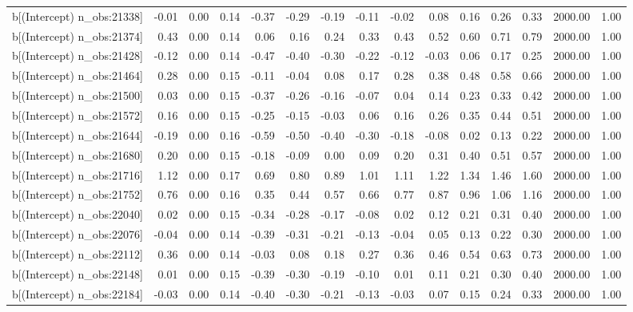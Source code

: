 \begin{table}[ht]
\begin{tabular}{rrrrrrrrrrrrrrr}
  b[(Intercept) n\_obs:21338] & -0.01 & 0.00 & 0.14 & -0.37 & -0.29 & -0.19 & -0.11 & -0.02 & 0.08 & 0.16 & 0.26 & 0.33 & 2000.00 & 1.00 \\ 
  b[(Intercept) n\_obs:21374] & 0.43 & 0.00 & 0.14 & 0.06 & 0.16 & 0.24 & 0.33 & 0.43 & 0.52 & 0.60 & 0.71 & 0.79 & 2000.00 & 1.00 \\ 
  b[(Intercept) n\_obs:21428] & -0.12 & 0.00 & 0.14 & -0.47 & -0.40 & -0.30 & -0.22 & -0.12 & -0.03 & 0.06 & 0.17 & 0.25 & 2000.00 & 1.00 \\ 
  b[(Intercept) n\_obs:21464] & 0.28 & 0.00 & 0.15 & -0.11 & -0.04 & 0.08 & 0.17 & 0.28 & 0.38 & 0.48 & 0.58 & 0.66 & 2000.00 & 1.00 \\ 
  b[(Intercept) n\_obs:21500] & 0.03 & 0.00 & 0.15 & -0.37 & -0.26 & -0.16 & -0.07 & 0.04 & 0.14 & 0.23 & 0.33 & 0.42 & 2000.00 & 1.00 \\ 
  b[(Intercept) n\_obs:21572] & 0.16 & 0.00 & 0.15 & -0.25 & -0.15 & -0.03 & 0.06 & 0.16 & 0.26 & 0.35 & 0.44 & 0.51 & 2000.00 & 1.00 \\ 
  b[(Intercept) n\_obs:21644] & -0.19 & 0.00 & 0.16 & -0.59 & -0.50 & -0.40 & -0.30 & -0.18 & -0.08 & 0.02 & 0.13 & 0.22 & 2000.00 & 1.00 \\ 
  b[(Intercept) n\_obs:21680] & 0.20 & 0.00 & 0.15 & -0.18 & -0.09 & 0.00 & 0.09 & 0.20 & 0.31 & 0.40 & 0.51 & 0.57 & 2000.00 & 1.00 \\ 
  b[(Intercept) n\_obs:21716] & 1.12 & 0.00 & 0.17 & 0.69 & 0.80 & 0.89 & 1.01 & 1.11 & 1.22 & 1.34 & 1.46 & 1.60 & 2000.00 & 1.00 \\ 
  b[(Intercept) n\_obs:21752] & 0.76 & 0.00 & 0.16 & 0.35 & 0.44 & 0.57 & 0.66 & 0.77 & 0.87 & 0.96 & 1.06 & 1.16 & 2000.00 & 1.00 \\ 
  b[(Intercept) n\_obs:22040] & 0.02 & 0.00 & 0.15 & -0.34 & -0.28 & -0.17 & -0.08 & 0.02 & 0.12 & 0.21 & 0.31 & 0.40 & 2000.00 & 1.00 \\ 
  b[(Intercept) n\_obs:22076] & -0.04 & 0.00 & 0.14 & -0.39 & -0.31 & -0.21 & -0.13 & -0.04 & 0.05 & 0.13 & 0.22 & 0.30 & 2000.00 & 1.00 \\ 
  b[(Intercept) n\_obs:22112] & 0.36 & 0.00 & 0.14 & -0.03 & 0.08 & 0.18 & 0.27 & 0.36 & 0.46 & 0.54 & 0.63 & 0.73 & 2000.00 & 1.00 \\ 
  b[(Intercept) n\_obs:22148] & 0.01 & 0.00 & 0.15 & -0.39 & -0.30 & -0.19 & -0.10 & 0.01 & 0.11 & 0.21 & 0.30 & 0.40 & 2000.00 & 1.00 \\ 
  b[(Intercept) n\_obs:22184] & -0.03 & 0.00 & 0.14 & -0.40 & -0.30 & -0.21 & -0.13 & -0.03 & 0.07 & 0.15 & 0.24 & 0.33 & 2000.00 & 1.00 \\ 

\end{tabular}
\end{table}
